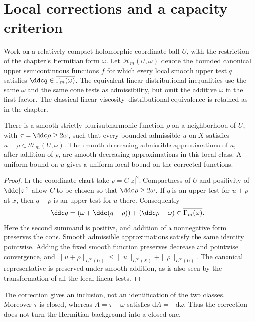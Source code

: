 \section{Local corrections and a capacity criterion}

Work on a relatively compact holomorphic coordinate ball $U$, with the
restriction of the chapter's Hermitian form $\omega$. Let
$\mathcal H_m(U,\omega)$ denote the bounded canonical upper
semicontinuous functions $f$ for which every local smooth upper test
$q$ satisfies $\ddc q\in\overline{\Gamma_m(\omega)}$.
The equivalent linear distributional inequalities use the same
$\omega$ and the same cone tests as admissibility, but omit the additive
$\omega$ in the first factor. The classical linear
viscosity--distributional equivalence is retained as in the chapter.

\begin{lemma}\label{draft619:local-correction}
There is a smooth strictly plurisubharmonic function $\rho$ on a
neighborhood of $\overline U$, with $\tau=\ddc\rho\geq2\omega$, such
that every bounded admissible $u$ on $X$ satisfies
$u+\rho\in\mathcal H_m(U,\omega)$. The smooth decreasing admissible
approximations of $u$, after addition of $\rho$, are smooth decreasing
approximations in this local class. A uniform bound on $u$ gives a
uniform local bound on the corrected functions.
\end{lemma}
\begin{proof}
In the coordinate chart take $\rho=C|z|^2$. Compactness of
$\overline U$ and positivity of $\ddc|z|^2$ allow $C$ to be chosen so
that $\ddc\rho\geq2\omega$. If $q$ is an upper test for $u+\rho$ at
$x$, then $q-\rho$ is an upper test for $u$ there. Consequently
\[
 \ddc q=(\omega+\ddc(q-\rho))+(\ddc\rho-\omega)
                    \in\overline{\Gamma_m(\omega)}.
\]
Here the second summand is positive, and addition of a nonnegative
form preserves the cone. Smooth admissible approximations satisfy the
same identity pointwise. Adding the fixed smooth function preserves
decrease and pointwise convergence, and
$\|u+\rho\|_{L^\infty(U)}\leq\|u\|_{L^\infty(X)}+\|\rho\|_{L^\infty(U)}$.
The canonical representative is preserved under smooth addition, as
is also seen by the transformation of all the local linear tests.
\end{proof}

The correction gives an inclusion, not an identification of the two
classes. Moreover $\tau$ is closed, whereas
$A=\tau-\omega$ satisfies $\mathrm dA=-\mathrm d\omega$.
Thus the correction does not turn the Hermitian background into a
closed one.

